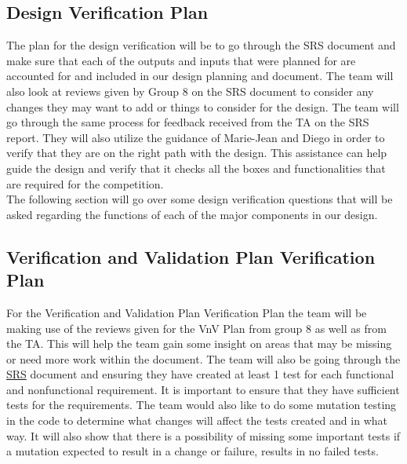 \documentclass[12pt, titlepage]{article}
\begin{document}
  
  \subsection{Design Verification Plan} \label{Design Verification Plan}
  
  The plan for the design verification will be to go through the SRS document and make sure that each of the outputs and inputs that were planned for are accounted for and included in our design planning and document. The team will also look at reviews given by Group 8 on the SRS document to consider any changes they may want to add or things to consider for the design. The team will go through the same process for feedback received from the TA on the SRS report. They will also utilize the guidance of Marie-Jean and Diego in order to verify that they are on the right path with the design. This assistance can help guide the design and verify that it checks all the boxes and functionalities that are required for the competition. \\

  The following section will go over some design verification questions that will be asked regarding the functions of each of the major components in our design.\\
  
  \subsection{Verification and Validation Plan Verification Plan}\label{Verification and Validation Plan Verification Plan}
  
  For the Verification and Validation Plan Verification Plan the team will be making use of the reviews given for the VnV Plan from group 8 as well as from the TA. This will help the team gain some insight on areas that may be missing or need more work within the document. The team will also be going through the \href{https://github.com/MichaelBreau/nlp-mentalhealth/blob/main/docs/SRS/index.pdf}{SRS} document and ensuring they have created at least 1 test for each functional and nonfunctional requirement. It is important to ensure that they have sufficient tests for the requirements. The team would also like to do some mutation testing in the code to determine what changes will affect the tests created and in what way. It will also show that there is a possibility of missing some important tests if a mutation expected to result in a change or failure, results in no failed tests.\\ 
\end{document}
